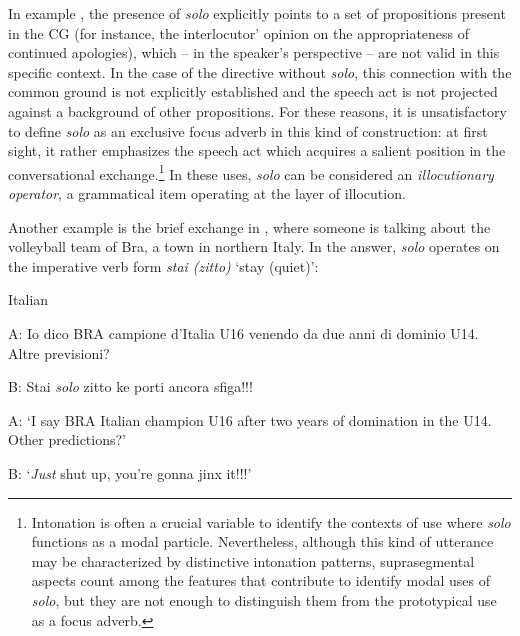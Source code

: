In example , the presence of \textit{solo} explicitly points to a set of propositions present in the CG (for instance, the interlocutor’ opinion on the appropriateness of continued apologies), which – in the speaker’s perspective – are not valid in this specific context. In the case of the directive without \textit{solo}, this connection with the common ground is not explicitly established and the speech act is not projected against a background of other propositions. For these reasons, it is unsatisfactory to define \textit{solo} as an exclusive focus adverb in this kind of construction: at first sight, it rather emphasizes the speech act which acquires a salient position in the conversational exchange.\footnote{Intonation is often a crucial variable to identify the contexts of use where \textit{solo} functions as a modal particle. Nevertheless, although this kind of utterance may be characterized by distinctive intonation patterns, suprasegmental aspects count among the features that contribute to identify modal uses of \textit{solo}, but they are not enough to distinguish them from the prototypical use as a focus adverb.} In these uses, \textit{solo} can be considered an \textit{illocutionary operator}, a grammatical item operating at the layer of illocution.

Another example is the brief exchange in , where someone is talking about the volleyball team of Bra, a town in northern Italy. In the answer, \textit{solo} operates on the imperative verb form \textit{stai (zitto)} ‘stay (quiet)’:

\ea%
    \label{ex:key:92}

           Italian \citep[122]{Favaro2020}

A:  Io dico BRA campione d’Italia U16 venendo da due anni di dominio U14. Altre previsioni?

B:  Stai \textit{solo} zitto ke porti ancora sfiga!!!

\glt
A:  ‘I say BRA Italian champion U16 after two years of domination in the U14. Other predictions?’

B:  ‘\textit{Just} shut up, you’re gonna jinx it!!!’
    \z %

